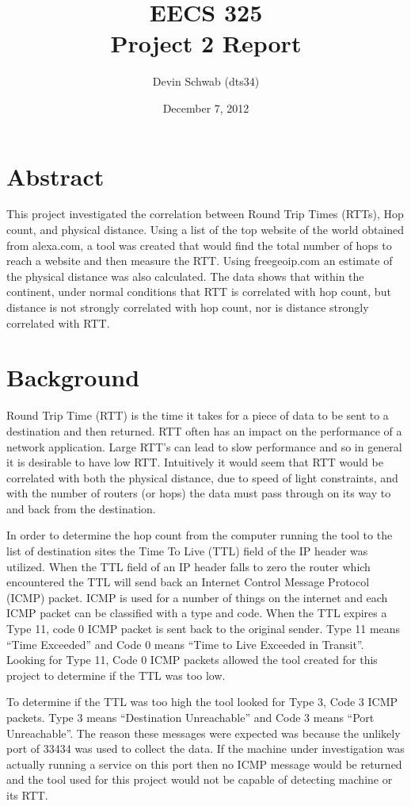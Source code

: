 \documentclass{article}
\title{EECS 325\\
       Project 2 Report}
\author{Devin Schwab (dts34)}
\date{December 7, 2012}
\begin{document}
\maketitle

\section*{Abstract}

This project investigated the correlation between Round Trip Times (RTTs), Hop count, and physical distance. Using a list of the top website of the world obtained from alexa.com, a tool was created that would find the total number of hops to reach a website and then measure the RTT. Using freegeoip.com an estimate of the physical distance was also calculated. The data shows that within the continent, under normal conditions that RTT is correlated with hop count, but distance is not strongly correlated with hop count, nor is distance strongly correlated with RTT.

\section*{Background}

Round Trip Time (RTT) is the time it takes for a piece of data to be sent to a destination and then returned. RTT often has an impact on the performance of a network application. Large RTT's can lead to slow performance and so in general it is desirable to have low RTT.  Intuitively it would seem that RTT would be correlated with both the physical distance, due to speed of light constraints, and with the number of routers (or hops) the data must pass through on its way to and back from the destination.

In order to determine the hop count from the computer running the tool to the list of destination sites the Time To Live (TTL) field of the IP header was utilized. When the TTL field of an IP header falls to zero the router which encountered the TTL will send back an Internet Control Message Protocol (ICMP) packet. ICMP is used for a number of things on the internet and each ICMP packet can be classified with a type and code. When the TTL expires a Type 11, code 0 ICMP packet is sent back to the original sender. Type 11 means ``Time Exceeded'' and Code 0 means ``Time to Live Exceeded in Transit''. Looking for Type 11, Code 0 ICMP packets allowed the tool created for this project to determine if the TTL was too low.

To determine if the TTL was too high the tool looked for Type 3, Code 3 ICMP packets. Type 3 means ``Destination Unreachable'' and Code 3 means ``Port Unreachable''. The reason these messages were expected was because the unlikely port of 33434 was used to collect the data. If the machine under investigation was actually running a service on this port then no ICMP message would be returned and the tool used for this project would not be capable of detecting machine or its RTT.
\end{document}

